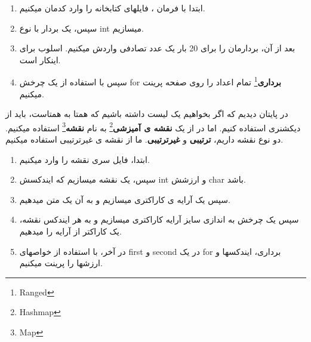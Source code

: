 \documentclass[14pt,a4paper]{memoir}
\begin{document}
	 
	 \begin{enumerate}
	 	\item  ابتدا با فرمان ، فایلهای کتابخانه را وارد کدمان میکنیم.
	 	\item  سپس، یک بردار با نوع int میسازیم. 
	 	\item  بعد از آن، بردارمان را برای 20 بار یک عدد تصادفی واردش میکنیم. اسلوب  برای اینکار است.
	 	\item سپس با استفاده از یک چرخش forِ \textbf{برداری}\footnote{Ranged} تمام اعداد را روی صفحه پرینت میکنیم.
	 \end{enumerate}
 
 در پایتان دیدیم که اگر بخواهیم یک لیست داشته باشیم که همتا به همتاست، باید از دیکشنری استفاده کنیم. اما در  از یک \textbf{نقشه ی آمیزشی}\footnote{Hashmap} به نام \textbf{نقشه}\footnote{Map} استفاده میکنیم. دو نوع نقشه داریم، \textbf{ترتیبی} و \textbf{غیرترتیبی}. ما از نقشه ی غیرترتیبی استفاده میکنیم.
 	 	 \begin{latin}
 	
 \end{latin}
 
	 \begin{enumerate}
	 	\item ابتدا، فایل سری نقشه را وارد میکنیم.
	 	\item  سپس، یک نقشه میسازیم که ایندکسش int و ارزشش char باشد.
	 	\item  سپس یک آرایه ی کاراکتری میسازیم و به آن یک متن میدهیم.
	 	\item سپس یک چرخش به اندازی سایز آرایه کاراکتری میسازیم و به هر ایندکس نقشه، یک کاراکتر از آرایه را میدهیم.
	 	\item  در آخر، با استفاده از خواصهای first و second در یک for برداری، ایندکسها و ارزشها را پرینت میکنیم.
	 \end{enumerate}
	 
	 
	 
\end{document}
